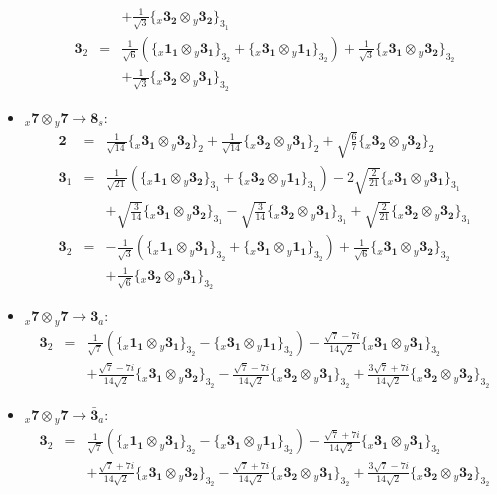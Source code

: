 \documentclass[english]{article}
\newcommand{\rep}[1]{\mathbf{#1}}
\newcommand{\repx}[2]{{}_{#2}\mathbf{#1}}
\newcommand{\subcg}[3]{\big\{ \repx{#1}{x}\otimes\repx{#2}{y}\big\}^{}_{#3}}
\begin{document}
\begin{itemize}
\begin{eqnarray*}
 & & +\frac{1}{\sqrt{3}}\subcg{3_{2}}{3_{2}}{3_{1}}
\\
\rep{3}_{2} &=& \frac{1}{\sqrt{6}}\left(\subcg{1_{1}}{3_{1}}{3_{2}}+\subcg{3_{1}}{1_{1}}{3_{2}}\right)+\frac{1}{\sqrt{3}}\subcg{3_{1}}{3_{2}}{3_{2}} \\ 
 & & +\frac{1}{\sqrt{3}}\subcg{3_{2}}{3_{1}}{3_{2}}
\end{eqnarray*}
\item $\repx{7}{x}\otimes\repx{7}{y}\to\rep{8}_{s}$:
\begin{eqnarray*}
\rep{2} &=& \frac{1}{\sqrt{14}}\subcg{3_{1}}{3_{2}}{2}+\frac{1}{\sqrt{14}}\subcg{3_{2}}{3_{1}}{2}+\sqrt{\frac{6}{7}}\subcg{3_{2}}{3_{2}}{2}
\\
\rep{3}_{1} &=& \frac{1}{\sqrt{21}}\left(\subcg{1_{1}}{3_{2}}{3_{1}}+\subcg{3_{2}}{1_{1}}{3_{1}}\right)-2 \sqrt{\frac{2}{21}}\subcg{3_{1}}{3_{1}}{3_{1}} \\ 
 & & +\sqrt{\frac{3}{14}}\subcg{3_{1}}{3_{2}}{3_{1}}-\sqrt{\frac{3}{14}}\subcg{3_{2}}{3_{1}}{3_{1}}+\sqrt{\frac{2}{21}}\subcg{3_{2}}{3_{2}}{3_{1}}
\\
\rep{3}_{2} &=& -\frac{1}{\sqrt{3}}\left(\subcg{1_{1}}{3_{1}}{3_{2}}+\subcg{3_{1}}{1_{1}}{3_{2}}\right)+\frac{1}{\sqrt{6}}\subcg{3_{1}}{3_{2}}{3_{2}} \\ 
 & & +\frac{1}{\sqrt{6}}\subcg{3_{2}}{3_{1}}{3_{2}}
\end{eqnarray*}
\item $\repx{7}{x}\otimes\repx{7}{y}\to\rep{3}_{a}$:
\begin{eqnarray*}
\rep{3}_{2} &=& \frac{1}{\sqrt{7}}\left(\subcg{1_{1}}{3_{1}}{3_{2}}-\subcg{3_{1}}{1_{1}}{3_{2}}\right)-\frac{\sqrt{7}-7 i}{14 \sqrt{2}}\subcg{3_{1}}{3_{1}}{3_{2}} \\ 
 & & +\frac{\sqrt{7}-7 i}{14 \sqrt{2}}\subcg{3_{1}}{3_{2}}{3_{2}}-\frac{\sqrt{7}-7 i}{14 \sqrt{2}}\subcg{3_{2}}{3_{1}}{3_{2}}+\frac{3 \sqrt{7}+7 i}{14 \sqrt{2}}\subcg{3_{2}}{3_{2}}{3_{2}}
\end{eqnarray*}
\item $\repx{7}{x}\otimes\repx{7}{y}\to\rep{\bar{3}}_{a}$:
\begin{eqnarray*}
\rep{3}_{2} &=& \frac{1}{\sqrt{7}}\left(\subcg{1_{1}}{3_{1}}{3_{2}}-\subcg{3_{1}}{1_{1}}{3_{2}}\right)-\frac{\sqrt{7}+7 i}{14 \sqrt{2}}\subcg{3_{1}}{3_{1}}{3_{2}} \\ 
 & & +\frac{\sqrt{7}+7 i}{14 \sqrt{2}}\subcg{3_{1}}{3_{2}}{3_{2}}-\frac{\sqrt{7}+7 i}{14 \sqrt{2}}\subcg{3_{2}}{3_{1}}{3_{2}}+\frac{3 \sqrt{7}-7 i}{14 \sqrt{2}}\subcg{3_{2}}{3_{2}}{3_{2}}
\end{eqnarray*}

\end{itemize}
\end{document}
